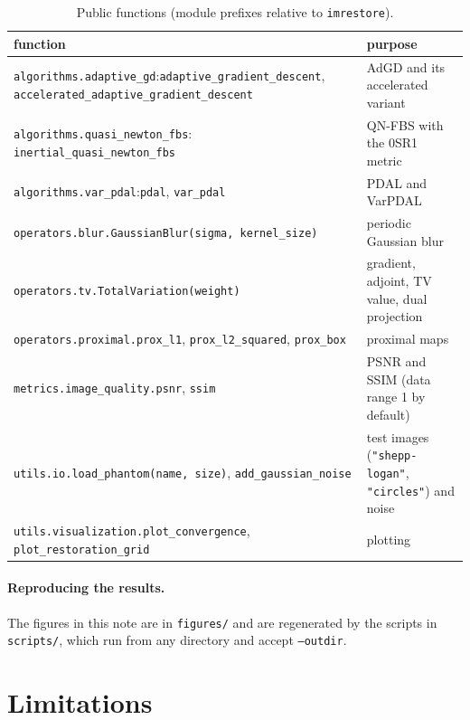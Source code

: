 \documentclass[11pt,a4paper]{article}
\newcommand{\code}[1]{\texttt{#1}}
\begin{document}
\begin{table}[ht]
\centering
\small
\caption{Public functions (module prefixes relative to \code{imrestore}).}
\label{tab:api}
\begin{tabular}{@{}p{}p{}@{}}
\toprule
function & purpose \\
\midrule
\code{algorithms.adaptive\_gd}:\newline \code{adaptive\_gradient\_descent},\newline
\code{accelerated\_adaptive\_gradient\_descent} & AdGD and its accelerated
  variant \\
\code{algorithms.quasi\_newton\_fbs}:\newline
\code{inertial\_quasi\_newton\_fbs} & QN-FBS with the 0SR1 metric \\
\code{algorithms.var\_pdal}:\newline \code{pdal}, \code{var\_pdal} & PDAL and VarPDAL \\
\code{operators.blur.GaussianBlur(sigma, kernel\_size)} & periodic Gaussian
  blur \\
\code{operators.tv.TotalVariation(weight)} & gradient, adjoint, TV value,
  dual projection \\
\code{operators.proximal.prox\_l1}, \code{prox\_l2\_squared},
  \code{prox\_box} & proximal maps \\
\code{metrics.image\_quality.psnr}, \code{ssim} & PSNR and SSIM (data range
  1 by default) \\
\code{utils.io.load\_phantom(name, size)}, \code{add\_gaussian\_noise}
  & test images (\code{"shepp-logan"}, \code{"circles"}) and noise \\
\code{utils.visualization.plot\_convergence},
  \code{plot\_restoration\_grid} & plotting \\
\bottomrule
\end{tabular}
\end{table}

\paragraph{Reproducing the results.} The figures in this note are in
\code{figures/} and are regenerated by the scripts in \code{scripts/},
which run from any directory and accept \code{--outdir}.

\section{Limitations}
\end{document}
